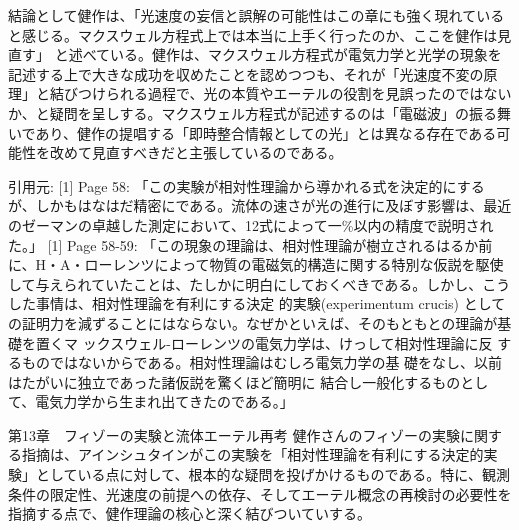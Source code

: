 \documentclass{article}
\begin{document}
結論として健作は、「光速度の妄信と誤解の可能性はこの章にも強く現れていると感じる。マクスウェル方程式上では本当に上手く行ったのか、ここを健作は見直す」 と述べている。健作は、マクスウェル方程式が電気力学と光学の現象を記述する上で大きな成功を収めたことを認めつつも、それが「光速度不変の原理」と結びつけられる過程で、光の本質やエーテルの役割を見誤ったのではないか、と疑問を呈しする。マクスウェル方程式が記述するのは「電磁波」の振る舞いであり、健作の提唱する「即時整合情報としての光」とは異なる存在である可能性を改めて見直すべきだと主張しているのである。

引用元:
[1] Page 58: 「この実験が相対性理論から導かれる式を決定的にするが、しかもはなはだ精密にである。流体の速さが光の進行に及ぼす影響は、最近のゼーマンの卓越した測定において、12式によって一\%以内の精度で説明された。」
[1] Page 58-59: 「この現象の理論は、相対性理論が樹立されるはるか前に、H・A・ローレンツによって物質の電磁気的構造に関する特別な仮説を駆使して与えられていたことは、たしかに明白にしておくべきである。しかし、こうした事情は、相対性理論を有利にする決定 的実験(experimentum crucis) としての証明力を減ずることにはならない。なぜかといえば、そのもともとの理論が基礎を置くマ ックスウェル-ローレンツの電気力学は、けっして相対性理論に反 するものではないからである。相対性理論はむしろ電気力学の基 礎をなし、以前はたがいに独立であった諸仮説を驚くほど簡明に 結合し一般化するものとして、電気力学から生まれ出てきたのである。」



第13章　フィゾーの実験と流体エーテル再考
健作さんのフィゾーの実験に関する指摘は、アインシュタインがこの実験を「相対性理論を有利にする決定的実験」としている点に対して、根本的な疑問を投げかけるものである。特に、観測条件の限定性、光速度の前提への依存、そしてエーテル概念の再検討の必要性を指摘する点で、健作理論の核心と深く結びついていする。
\end{document}
